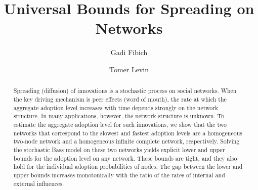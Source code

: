 \documentclass[review]{elsarticle}
\begin{document}
\begin{frontmatter}



\title{Universal Bounds for Spreading on Networks}


\author[mymainaddress]{Gadi Fibich}

\author[mymainaddress]{Tomer Levin}


\address[mymainaddress]{Department of Applied Mathematics, School of Mathematical Sciences, Tel Aviv University, Tel Aviv 6997801, Israel}

\begin{abstract}
	Spreading (diffusion) of innovations is a stochastic process on social networks. When the key driving mechanism is peer effects (word of mouth), the rate at which the aggregate adoption level increases with time depends strongly on the network structure. In many applications, however, the  network structure is unknown. To estimate the aggregate adoption level for such innovations, we show that the two networks that correspond to the slowest and fastest adoption levels are a homogeneous two-node network and a homogeneous infinite  complete network, respectively.  Solving the stochastic Bass model on these two networks yields explicit lower and upper bounds for the adoption level on any network. These bounds are tight, and they also hold for the individual adoption probabilities of nodes. The gap between the lower and upper bounds increases monotonically with the ratio of the rates of internal and external influences.
\end{abstract}



\end{frontmatter}
\end{document}
